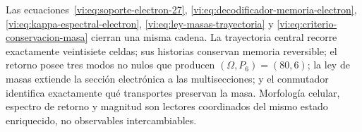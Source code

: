Las ecuaciones~\eqref{vi:eq:soporte-electron-27},
\eqref{vi:eq:decodificador-memoria-electron},
\eqref{vi:eq:kappa-espectral-electron},
\eqref{vi:eq:ley-masas-trayectoria} y
\eqref{vi:eq:criterio-conservacion-masa} cierran una misma cadena. La
trayectoria central recorre exactamente veintisiete celdas; sus historias
conservan memoria reversible; el retorno posee tres modos no nulos que
producen $(\Omega,P_6)=(80,6)$; la ley de masas extiende la sección
electrónica a las multisecciones; y el conmutador identifica exactamente
qué transportes preservan la masa. Morfología celular, espectro de retorno y
magnitud son lectores coordinados del mismo estado enriquecido, no
observables intercambiables.
